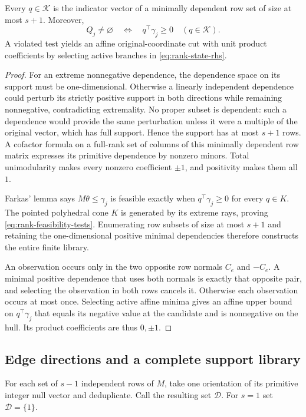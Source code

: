 \begin{lemma}\label{lem:rank-circuits}
Every $q\in\mathcal K$ is the indicator vector of a minimally dependent
row set of size at most $s+1$. Moreover,
\begin{equation}\label{eq:rank-feasibility-tests}
 Q_j\ne\varnothing\quad\Longleftrightarrow\quad
             q^\top\gamma_j\ge0\quad(q\in\mathcal K).
\end{equation}
A violated test yields an affine original-coordinate cut with unit
product coefficients by selecting active branches in \eqref{eq:rank-state-rhs}.
\end{lemma}
\begin{proof}
For an extreme nonnegative dependence, the dependence space on its support
must be one-dimensional. Otherwise a linearly independent dependence could
perturb its strictly positive support in both directions while remaining
nonnegative, contradicting extremality. No proper subset is dependent:
such a dependence would provide the same perturbation unless it were a
multiple of the original vector, which has full support. Hence the support
has at most $s+1$ rows. A cofactor formula on a full-rank set of columns
of this minimally dependent row matrix expresses its primitive dependence
by nonzero minors. Total unimodularity makes every nonzero coefficient
$\pm1$, and positivity makes them all $1$.

Farkas' lemma says $M\theta\le\gamma_j$ is feasible exactly when
$q^\top\gamma_j\ge0$ for every $q\in K$. The pointed polyhedral cone
$K$ is generated by its extreme rays, proving
\eqref{eq:rank-feasibility-tests}. Enumerating row subsets of size at
most $s+1$ and retaining the one-dimensional positive minimal dependencies
therefore constructs the entire finite library.

An observation occurs only in the two opposite row normals $C_e$ and
$-C_e$. A minimal positive dependence that uses both normals is exactly
that opposite pair, and selecting the observation in both rows cancels
it. Otherwise each observation occurs at most once. Selecting
active affine minima gives an affine upper bound on
$q^\top\gamma_j$ that equals its negative value at the candidate and
is nonnegative on the hull. Its product coefficients are thus $0,\pm1$.
\end{proof}

\subsection{Edge directions and a complete support library}\label{subsec:rank-support-rays}
For each set of $s-1$ independent rows of $M$, take one orientation of
its primitive integer null vector and deduplicate. Call the resulting
set $\mathcal D$. For $s=1$ set $\mathcal D=\{1\}$.

